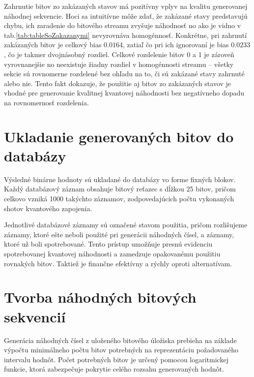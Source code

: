 Zahrnutie bitov zo zakázaných stavov má pozitívny vplyv na kvalitu generovanej náhodnej sekvencie.
Hoci sa intuitívne môže zdať, že zakázané stavy predstavujú chybu, ich zaradenie do bitového streamu zvyšuje náhodnosť no ako je vidno v tab.\ref{tab:tableSoZakazanymi} nevyrovnáva homogénnosť.
Konkrétne, pri zahrnutí zakázaných bitov je celkový bias $0.0164$, zatiaľ čo pri ich ignorovaní je bias $0.0233$, čo je takmer dvojnásobný rozdiel.
Celkové rozdelenie bitov 0 a 1 je zároveň vyrovnanejšie no neexistuje žiadny rozdiel v homogénnosti streamu – všetky sekcie sú rovnomerne rozdelené bez ohľadu na to, či sú zakázané stavy zahrnuté alebo nie.
Tento fakt dokazuje, že použitie aj bitov zo zakázaných stavov je vhodné pre generovanie kvalitnej kvantovej náhodnosti bez negatívneho dopadu na rovnomernosť rozdelenia.





\section{Ukladanie generovaných bitov do databázy}

Výsledné binárne hodnoty sú ukladané do databázy vo forme fixných blokov.
Každý databázový záznam obsahuje bitový reťazec s dĺžkou 25 bitov, pričom celkovo vzniká 1000 takýchto záznamov, zodpovedajúcich počtu vykonaných shotov kvantového zapojenia.

Jednotlivé databázové záznamy sú označené stavom použitia, pričom rozlišujeme záznamy, ktoré ešte neboli použité pri generácii náhodných čísel, a záznamy, ktoré už boli spotrebované.
Tento prístup umožňuje presnú evidenciu spotrebovanej kvantovej náhodnosti a zamedzuje opakovanému použitiu rovnakých bitov.
Taktiež je finančne efektívny a rýchly oproti alternatívam.

\section{Tvorba náhodných bitových sekvencií}

Generácia náhodných čísel z uloženého bitového úložiska prebieha na základe výpočtu minimálneho počtu bitov potrebných na reprezentáciu požadovaného intervalu hodnôt.
Počet potrebných bitov je určený pomocou logaritmickej funkcie, ktorá zabezpečuje pokrytie celého rozsahu generovaných hodnôt.

